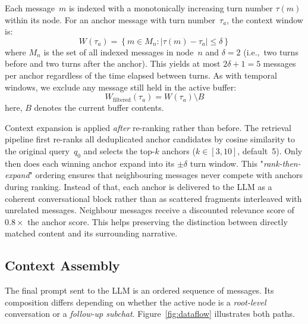 Each message~$m$ is indexed with a monotonically increasing turn number $\tau(m)$ within its node. For an anchor message with turn number~$\tau_a$, the context window is:
\begin{equation}
W(\tau_a) = \left\{m \in M_{n} : |\tau(m) - \tau_a| \leq \delta\right\}
\label{eq:window}
\end{equation}
where $M_n$ is the set of all indexed messages in node~$n$ and $\delta = 2$ (i.e.,\ two turns before and two turns after the anchor). This yields at most $2\delta + 1 = 5$ messages per anchor regardless of the time elapsed between turns. As with temporal windows, we exclude any message still held in the active buffer:
\begin{equation}
W_{\mathrm{filtered}}(\tau_a) = W(\tau_a) \setminus B
\label{eq:window_filtered}
\end{equation}
here, $B$ denotes the current buffer contents.

Context expansion is applied \emph{after} re-ranking rather than before. The retrieval pipeline first re-ranks all deduplicated anchor candidates by cosine similarity to the original query~$q_0$ and selects the top-$k$ anchors ($k \in [3, 10]$, default~5). Only then does each winning anchor expand into its $\pm\delta$ turn window. This "\emph{rank-then-expand}" ordering ensures that neighbouring  messages never compete with anchors during ranking. Instead of that, each anchor is delivered to the LLM as a coherent conversational block rather than as scattered fragments interleaved with unrelated messages. Neighbour messages receive a discounted relevance score of $0.8 \times$ the anchor score. This helps preserving the distinction between directly matched content and its surrounding narrative.

\subsection{Context Assembly}\label{subsubsec:assembly}

The final prompt sent to the LLM is an ordered sequence of messages. Its composition differs depending on whether the active node is a \emph{root-level} conversation or a \emph{follow-up subchat}. Figure~\ref{fig:dataflow} illustrates both paths.

